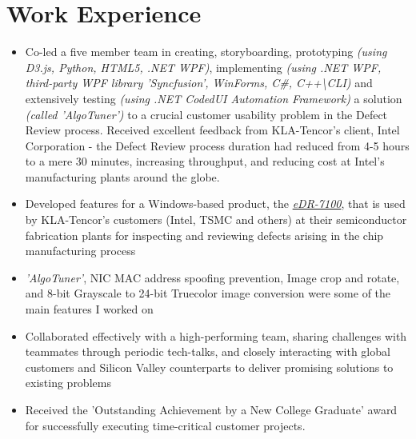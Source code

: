 \section{Work Experience}

	
\vspace{1.8mm}
	\begin{itemize}
		\setlength\itemsep{0.3em}
		\item Co-led a five member team in creating, storyboarding, prototyping \emph{(using D3.js, Python, HTML5, .NET WPF)}, implementing \emph{(using .NET WPF, third-party WPF library 'Syncfusion', WinForms, C\#, C++\textbackslash CLI)} and extensively testing \emph{(using .NET CodedUI Automation Framework)} a solution \emph{(called 'AlgoTuner')} to a crucial customer usability problem in the Defect Review process. Received excellent feedback from KLA-Tencor's client, Intel Corporation - the Defect Review process duration had reduced from 4-5 hours to a mere 30 minutes, increasing throughput, and reducing cost at Intel's manufacturing plants around the globe.
		\item Developed features for a Windows-based product, the \href{http://www.kla-tencor.com/Defect-Review/edr-7100-series.html}{\emph{eDR-7100}}, that is used by KLA-Tencor's customers (Intel, TSMC and others) at their semiconductor fabrication plants for inspecting and reviewing defects arising in the chip manufacturing process 
		\item \emph{'AlgoTuner'}, NIC MAC address spoofing prevention, Image crop and rotate, and 8-bit Grayscale to 24-bit Truecolor image conversion were some of the main features I worked on
		\item Collaborated effectively with a high-performing team, sharing challenges with teammates through periodic tech-talks, and closely interacting with global customers and Silicon Valley counterparts to deliver promising solutions to existing problems
		\item Received the 'Outstanding Achievement by a New College Graduate' award for successfully executing time-critical customer projects.
	\end{itemize}
	
